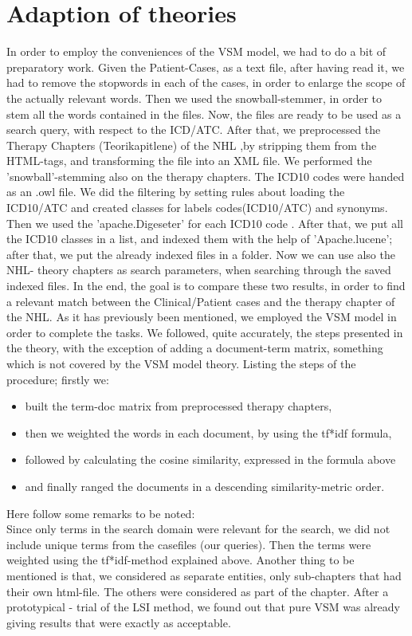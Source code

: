 \section{Adaption of theories}
In order to employ the conveniences of the VSM model, we had to do a bit of preparatory work.
Given the Patient-Cases, as a text file, after having read it, we had to remove the stopwords in each of the cases, in order to enlarge the scope of the actually relevant words.
Then we used the snowball-stemmer, in order to stem all the words contained in the files. Now, the files are ready to be used as a search query, with respect to the ICD/ATC.
After that, we preprocessed the Therapy Chapters (Teorikapitlene) of the NHL ,by stripping them from the HTML-tags, and transforming the file into an XML file. We performed the 'snowball'-stemming also on the therapy chapters.
The ICD10 codes were handed as an .owl file. We did the filtering by setting rules about loading the ICD10/ATC and created classes for labels codes(ICD10/ATC) and synonyms.
Then we used the 'apache.Digeseter' for each ICD10 code . After that, we put all the ICD10 classes in a list, and indexed them with the help of 'Apache.lucene'; after that, we put the already indexed files in a folder. Now we can use also the NHL- theory chapters as search parameters, when searching through the saved indexed files. In the end, the goal is to compare these two results, in order to find a relevant match between the Clinical/Patient cases and the therapy chapter of the NHL. 
As it has previously been mentioned, we employed the VSM model in order to complete the tasks. We followed, quite accurately, the steps presented in the theory, with the exception of adding a document-term matrix, something which is not covered by the VSM model theory. Listing the steps of the procedure; firstly we:
\begin{itemize}
\item{built the term-doc matrix from preprocessed therapy chapters,}
\item{then we weighted the words in each document, by using the tf*idf  formula,}
\item{followed by calculating the cosine similarity, expressed in the formula above}
\item{and finally ranged the documents in a descending similarity-metric order.}
\end{itemize}
Here follow some remarks to be noted: \\
Since only terms in the search domain were relevant for the search, we did not include unique terms from the casefiles (our queries). Then the terms were weighted using the tf*idf-method explained above. 
Another thing to be mentioned is that, we considered as separate entities, only sub-chapters that had their own html-file. The others were considered as part of the chapter. 
After a prototypical - trial of the LSI method, we found out that pure VSM was already giving results that were exactly as acceptable. 